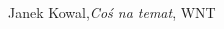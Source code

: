 %
%

\clearpage
{}
{}
\begin{thebibliography}{99}



 Janek Kowal,\emph{Coś na temat}, WNT

\end{thebibliography} 